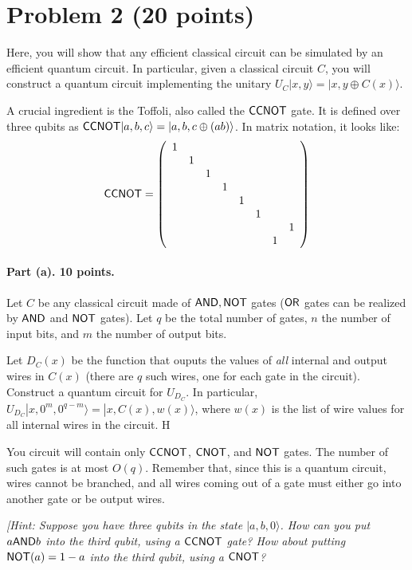 \documentclass{article}
\begin{document}
\section{Problem 2 (20 points)}

Here, you will show that any efficient classical circuit can be simulated by an efficient quantum circuit. In particular, given a classical circuit $C$, you will construct a quantum circuit implementing the unitary $U_C|x,y\rangle=|x,y\oplus C(x)\rangle$.

A crucial ingredient is the Toffoli, also called the ${\sf CCNOT}$ gate. It is defined over three qubits as ${\sf CCNOT}|a,b,c\rangle=|a,b,c\oplus(ab)\rangle$. In matrix notation, it looks like:
\[{\sf CCNOT}=\left(\begin{array}{cccccccc}1&&&&&&&\\&1&&&&&&\\&&1&&&&&\\&&&1&&&&\\&&&&1&&&\\&&&&&1&&\\&&&&&&&1\\&&&&&&1&\end{array}\right)\]

\paragraph{Part (a). 10 points.} Let $C$ be any classical circuit made of ${\sf AND},{\sf NOT}$ gates (${\sf OR}$ gates can be realized by ${\sf AND}$ and ${\sf NOT}$ gates). Let $q$ be the total number of gates, $n$ the number of input bits, and $m$ the number of output bits. 

Let $D_C(x)$ be the function that ouputs the values of \emph{all} internal and output wires in $C(x)$ (there are $q$ such wires, one for each gate in the circuit). Construct a quantum circuit for $U_{D_C}$. In particular, $U_{D_C}|x,0^m,0^{q-m}\rangle=|x,C(x),w(x)\rangle$, where $w(x)$ is the list of wire values for all internal wires in the circuit. H

You circuit will contain only ${\sf CCNOT}$, ${\sf CNOT}$, and ${\sf NOT}$ gates. The number of such gates is at most $O(q)$. Remember that, since this is a quantum circuit, wires cannot be branched, and all wires coming out of a gate must either go into another gate or be output wires.

\emph{[Hint: Suppose you have three qubits in the state $|a,b,0\rangle$. How can you put $a{\sf AND} b$ into the third qubit, using a ${\sf CCNOT}$ gate? How about putting ${\sf NOT}(a)=1-a$ into the third qubit, using a ${\sf CNOT}$? }
\end{document}
